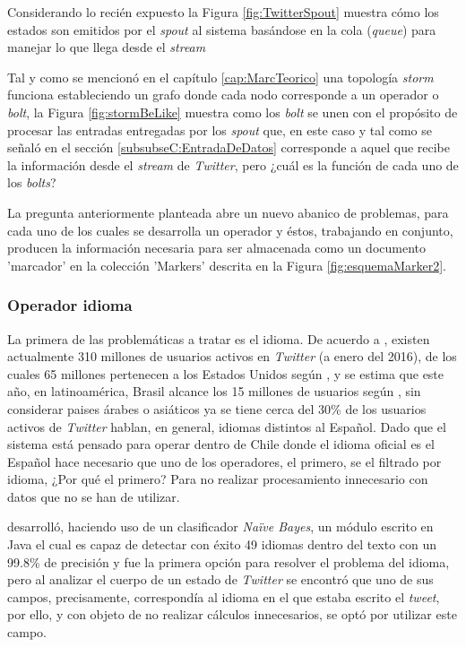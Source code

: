 Considerando lo recién expuesto la Figura \ref{fig:TwitterSpout} muestra cómo los estados son emitidos por el \textit{spout} al sistema basándose en la cola (\textit{queue}) para manejar lo que llega desde el \textit{stream}

Tal y como se mencionó en el capítulo \ref{cap:MarcTeorico} una topología \textit{storm} funciona estableciendo un grafo donde cada nodo corresponde a un operador o \textit{bolt}, la Figura \ref{fig:stormBeLike} muestra como los \textit{bolt} se unen con el propósito de procesar las entradas entregadas por los \textit{spout} que, en este caso y tal como se señaló en el sección \ref{subsubseC:EntradaDeDatos} corresponde a aquel que recibe la información desde el \textit{stream} de \textit{Twitter}, pero ¿cuál es la función de cada uno de los \textit{bolts}?

La pregunta anteriormente planteada abre un nuevo abanico de problemas, para cada uno de los cuales se desarrolla un operador y éstos, trabajando en conjunto, producen la información necesaria para ser almacenada como un documento 'marcador' en la colección 'Markers' descrita en la Figura \ref{fig:esquemaMarker2}.

\subsubsection*{Operador idioma}
\label{subsubsec:1op}

La primera de las problemáticas a tratar es el idioma. De acuerdo a \cite{TwitterActiveUsers}, existen actualmente 310 millones de usuarios activos en \textit{Twitter} (a enero del 2016), de los cuales 65 millones pertenecen a los Estados Unidos según \cite{TwitterStats1}, y se estima que este año, en latinoamérica, Brasil alcance los 15 millones de usuarios según \cite{TwitterStats2}, sin considerar paises árabes o asiáticos ya se tiene cerca del 30\% de los usuarios activos de \textit{Twitter} hablan, en general, idiomas distintos al Español. Dado que el sistema está pensado para operar dentro de Chile donde el idioma oficial es el Español hace necesario que uno de los operadores, el primero, se el filtrado por idioma, ¿Por qué el primero? Para no realizar procesamiento innecesario con datos que no se han de utilizar.

\cite{languageDetector} desarrolló, haciendo uso de un clasificador \textit{Naïve Bayes}, un módulo escrito en Java el cual es capaz de detectar con éxito 49 idiomas dentro del texto con un 99.8\% de precisión y fue la primera opción para resolver el problema del idioma, pero al analizar el cuerpo de un estado de \textit{Twitter} se encontró que uno de sus campos, precisamente, correspondía al idioma en el que estaba escrito el \textit{tweet}, por ello, y con objeto de no realizar cálculos innecesarios, se optó por utilizar este campo.

